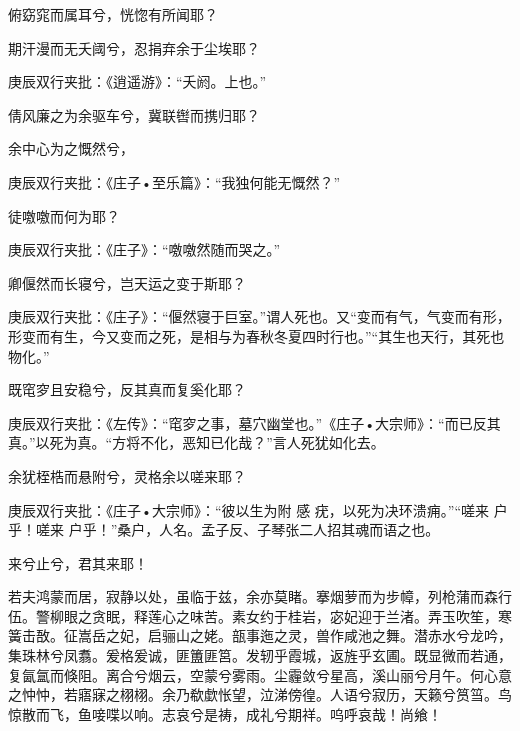 \begin{poem}
\begin{pl}
        俯窈窕而属耳兮，恍惚有所闻耶？
    \end{pl}
    \begin{pl}

        期汗漫而无夭阈兮，忍捐弃余于尘埃耶？\begin{note}庚辰双行夹批：《逍遥游》：“夭阏。上也。”\end{note}
    \end{pl}
    \begin{pl}

        倩风廉之为余驱车兮，冀联辔而携归耶？
    \end{pl}
    \begin{pl}

        余中心为之慨然兮，\begin{note}庚辰双行夹批：《庄子•至乐篇》：“我独何能无慨然？”\end{note}徒噭噭而何为耶？\begin{note}庚辰双行夹批：《庄子》：“噭噭然随而哭之。”\end{note}
    \end{pl}
    \begin{pl}

        卿偃然而长寝兮，岂天运之变于斯耶？\begin{note}庚辰双行夹批：《庄子》：“偃然寝于巨室。”谓人死也。又“变而有气，气变而有形，形变而有生，今又变而之死，是相与为春秋冬夏四时行也。”“其生也天行，其死也物化。”\end{note}
    \end{pl}
    \begin{pl}

        既窀穸且安稳兮，反其真而复奚化耶？\begin{note}庚辰双行夹批：《左传》：“窀穸之事，墓穴幽堂也。”《庄子•大宗师》：“而已反其真。”以死为真。“方将不化，恶知已化哉？”言人死犹如化去。\end{note}
    \end{pl}
    \begin{pl}

        余犹桎梏而悬附兮，灵格余以嗟来耶？\begin{note}庚辰双行夹批：《庄子•大宗师》：“彼以生为附 感 疣，以死为决环溃痈。”“嗟来 户乎！嗟来 户乎！”桑户，人名。孟子反、子琴张二人招其魂而语之也。\end{note}
    \end{pl}
    \begin{pl}

        来兮止兮，君其来耶！
    \end{pl}
    \begin{pl}

        若夫鸿蒙而居，寂静以处，虽临于兹，余亦莫睹。搴烟萝而为步幛，列枪蒲而森行伍。警柳眼之贪眠，释莲心之味苦。素女约于桂岩，宓妃迎于兰渚。弄玉吹笙，寒簧击敔。征嵩岳之妃，启骊山之姥。瓿事迤之灵，兽作咸池之舞。潜赤水兮龙吟，集珠林兮凤翥。爰格爰诚，匪簠匪筥。发轫乎霞城，返旌乎玄圃。既显微而若通，复氤氲而倏阻。离合兮烟云，空蒙兮雾雨。尘霾敛兮星高，溪山丽兮月午。何心意之忡忡，若寤寐之栩栩。余乃欷歔怅望，泣涕傍徨。人语兮寂历，天籁兮筼筜。鸟惊散而飞，鱼唼喋以响。志哀兮是祷，成礼兮期祥。呜呼哀哉！尚飨！
    \end{pl}
\end{poem}

